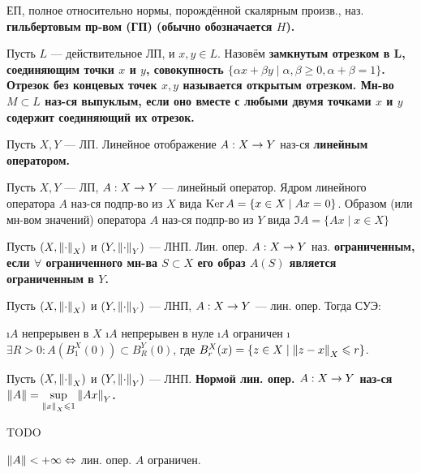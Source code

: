 \begin{defn}
ЕП, полное относительно нормы, порождённой скалярным произв., наз. \bf{гильбертовым пр-вом (ГП)} (обычно обозначается $H$).
\end{defn}

\begin{defn}
Пусть $L$ --- действительное ЛП, и $x, y \in L$. Назовём \bf{замкнутым отрезком} в L, соединяющим точки $x$ и $y$, совокупность $\{\alpha x + \beta y \mid \alpha, \beta \ge 0, \alpha + \beta = 1\}$. Отрезок без концевых точек $x, y$ называется \bf{открытым отрезком}.
Мн-во $M \subset L$ наз-ся выпуклым, если оно вместе с любыми двумя точками $x$ и $y$ содержит соединяющий их отрезок.
\end{defn}

\begin{defn}
Пусть $X, Y$ --- ЛП. Линейное отображение $A: X \rightarrow Y$ наз-ся \bf{линейным оператором}.
\end{defn}

\begin{defn}
Пусть $X, Y$ --- ЛП, $A: X \rightarrow Y$ --- линейный оператор. Ядром линейного оператора $A$ наз-ся подпр-во из $X$ вида $\operatorname{Ker} A = \{x \in X \mid Ax = 0\}$. Образом (или мн-вом значений) оператора $A$ наз-ся подпр-во из $Y$ вида $\Im A = \{Ax \mid x \in X\}$
\end{defn}

\begin{defn}
Пусть $(X, \left\lVert\cdot\right\rVert_X)$ и $(Y, \left\lVert\cdot\right\rVert_Y)$ --- ЛНП. Лин. опер. $A: X \rightarrow Y$ наз. \bf{ограниченным}, если $\forall$ ограниченного мн-ва $S \subset X$ его образ $A(S)$ является ограниченным в $Y$. 
\end{defn}

\begin{stmt}
Пусть $(X, \left\lVert\cdot\right\rVert_X)$ и $(Y, \left\lVert\cdot\right\rVert_Y)$ --- ЛНП, $A: X \rightarrow Y$ --- лин. опер. Тогда СУЭ:
\begin{enumerate}
\i $A$ непрерывен в $X$
\i $A$ непрерывен в нуле
\i $A$ ограничен
\i $\exists R > 0: A(B_1^X(0)) \subset B_R^Y(0)$, где $B_r^X (x) = \{z \in X \mid \left\lVert z-x\right\rVert_X \leqslant r\}$.
\end{enumerate}
\end{stmt}

\begin{defn}
Пусть $(X, \left\lVert\cdot\right\rVert_X)$ и $(Y, \left\lVert\cdot\right\rVert_Y)$ --- ЛНП. \bf{Нормой} лин. опер. $A: X \rightarrow Y$ наз-ся $\left\lVert A\right\rVert = \sup\limits_{\left\lVert x\right\rVert_X \leqslant 1} \left\lVert Ax\right\rVert_Y$.
\end{defn}

\begin{stmt}
TODO
\end{stmt}

\begin{defn}
$\left\lVert A\right\rVert < +\infty \Leftrightarrow $ лин. опер. $A$ ограничен.
\end{defn}

\begin{defn}

\end{defn}


